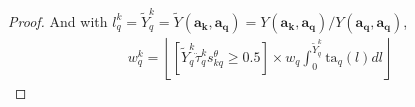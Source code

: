 {\begin{proof}
        And with $
        l_{q}^{k}
        = \tilde{Y}_{q}^{k}
        = \tilde{Y}(\boldsymbol{a_k}, \boldsymbol{a_q})
        = Y(\boldsymbol{a_k}, \boldsymbol{a_q}) / Y(\boldsymbol{a_q}, \boldsymbol{a_q})$,
        \begin{gather}
            w_{q}^{k} =
            \left\lfloor
                [
                    \tilde{Y}_{q}^{k}
                    \ddot{\tau}_{q}^{k}
                    s_{kq}^{\theta}
                    \geq 0.5
                ]
                \times
                w_q
                \int_{0}^{\tilde{Y}_{q}^{k}}
                \text{ta}_q(l)
                dl
            \right\rfloor
        \end{gather}
    \end{proof}

}


